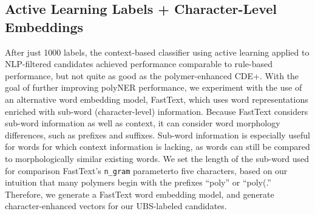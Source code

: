 \subsection{Active Learning Labels + Character-Level Embeddings}
\label{sec:results}
After just 1000 labels, the context-based classifier using active learning applied to NLP-filtered candidates achieved performance comparable to rule-based performance, 
but not quite as good as the polymer-enhanced CDE+.
With the goal of further improving polyNER performance,
we experiment with the use of an alternative word embedding model, FastText, which 
uses word representations enriched with sub-word (character-level) information.
Because FastText considers sub-word information as well as
context, it can consider word morphology differences, such as prefixes
and suffixes. Sub-word information is especially useful for words for which
context information is lacking, as words can still be compared to morphologically similar
existing words. We set the length of the sub-word used for comparison\textemdash
FastText's \texttt{n_gram} parameter\textemdash to five characters, based on our intuition that
many polymers begin with the prefixes ``poly'' or ``poly(.'' 
Therefore, we generate a FastText word embedding model, 
and generate character-enhanced vectors for our UBS-labeled candidates.


